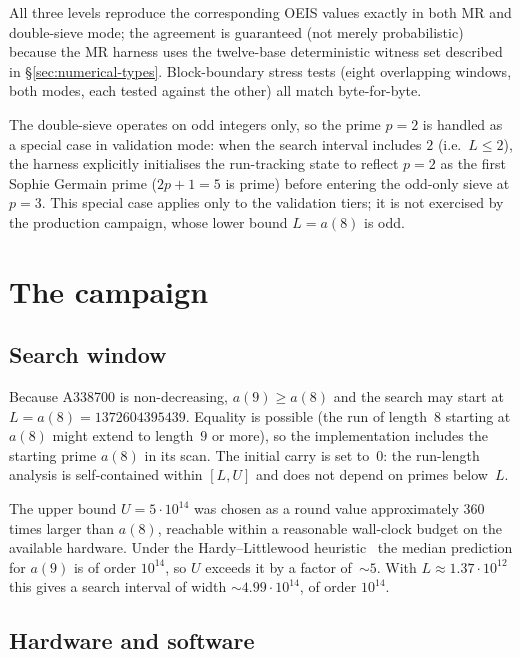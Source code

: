 \documentclass[11pt,a4paper]{article}
\theoremstyle{definition}
\begin{document}
All three levels reproduce the corresponding OEIS values exactly in both
MR and double-sieve mode; the agreement is guaranteed (not merely
probabilistic) because the MR harness uses the twelve-base deterministic
witness set described in §\ref{sec:numerical-types}. Block-boundary
stress tests (eight overlapping windows, both modes, each tested against
the other) all match byte-for-byte.

The double-sieve operates on odd integers only, so the prime $p = 2$ is
handled as a special case in validation mode: when the search interval
includes $2$ (i.e.\ $L \le 2$), the harness explicitly initialises the
run-tracking state to reflect $p = 2$ as the first Sophie Germain prime
($2p+1 = 5$ is prime) before entering the odd-only sieve at $p = 3$.
This special case applies only to the validation tiers; it is not
exercised by the production campaign, whose lower bound $L = a(8)$ is
odd.

\section{The campaign}
\label{sec:campaign}

\subsection{Search window}

Because A338700 is non-decreasing, $a(9) \ge a(8)$ and the search may
start at $L = a(8) = \num{1372604395439}$. Equality is possible (the run
of length~$8$ starting at $a(8)$ might extend to length~$9$ or more), so
the implementation includes the starting prime $a(8)$ in its scan. The
initial carry is set to~$0$: the run-length analysis is self-contained
within $[L, U]$ and does not depend on primes below~$L$.

The upper bound $U = 5\cdot 10^{14}$ was chosen as a round value
approximately $360$ times larger than $a(8)$, reachable within a
reasonable wall-clock budget on the available hardware. Under the
Hardy--Littlewood heuristic~\cite{hardy-littlewood} the median prediction
for $a(9)$ is of order $10^{14}$, so $U$ exceeds it by a factor
of~$\sim 5$. With $L \approx 1.37\cdot 10^{12}$ this gives a
search interval of width $\sim 4.99\cdot 10^{14}$, of order $10^{14}$.

\subsection{Hardware and software}
\end{document}
